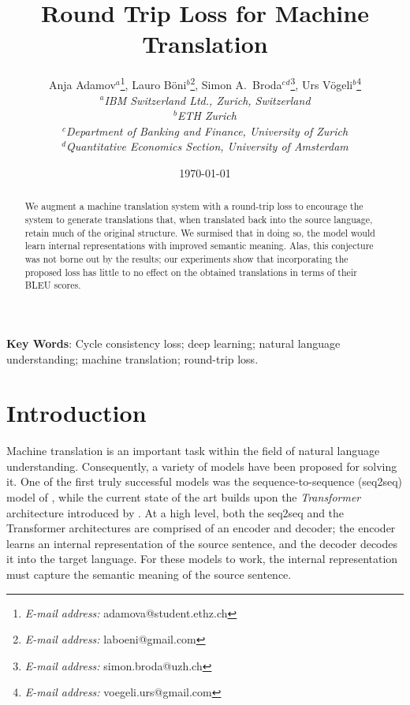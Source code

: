 \documentclass[11pt,a4paper]{article}
\begin{document}
\title{Round Trip Loss for Machine Translation}
\date{\today}
\author{
Anja Adamov$\mbox{}^a$\thanks{\emph{E-mail address:} adamova@student.ethz.ch},
Lauro B\"{o}ni$\mbox{}^b$\thanks{\emph{E-mail address:} laboeni@gmail.com},
Simon A.\ Broda$\mbox{}^c\mbox{}^d$\thanks{\emph{E-mail address:} simon.broda@uzh.ch},
Urs V\"{o}geli$\mbox{}^b$\thanks{\emph{E-mail address:} voegeli.urs@gmail.com}
\medskip \\
\textit{\small $\mbox{}^a$IBM Switzerland Ltd., Zurich, Switzerland}
\medskip \\
\textit{\small $\mbox{}^b$ETH Zurich}
\medskip \\
\textit{\small $\mbox{}^c$Department of Banking and Finance, University of Zurich}
\medskip \\
\textit{\small $\mbox{}^d$Quantitative Economics Section, University of Amsterdam}
}
\maketitle \setcounter{page}{0}\thispagestyle{empty}
\begin{abstract}
We augment a machine translation system with a round-trip loss to encourage the system to generate translations that, when translated back into the source language, retain much of the original structure. We surmised that in doing so, the model would learn internal representations with improved semantic meaning. Alas, this conjecture was not borne out by the results; our experiments show that incorporating the proposed loss has little to no effect on the obtained translations in terms of their BLEU scores.
\end{abstract}
\bigskip \textbf{Key Words}: Cycle consistency loss; deep learning; natural language understanding; machine translation; round-trip loss.
\newpage
\setcounter{page}{1}
\section{Introduction}
Machine translation is an important task within the field of natural language understanding. Consequently, a variety of models have been proposed for solving it. One of the first truly successful models was the sequence-to-sequence (seq2seq) model of \citet{seq2seq}, while the current state of the art builds upon the \emph{Transformer} architecture introduced by \citet{transformer}. At a high level, both the seq2seq and the Transformer architectures are comprised of an encoder and decoder; the encoder learns an internal representation of the source sentence, and the decoder decodes it into the target language. For these models to work, the internal representation must capture the semantic meaning of the source sentence.
\end{document}
